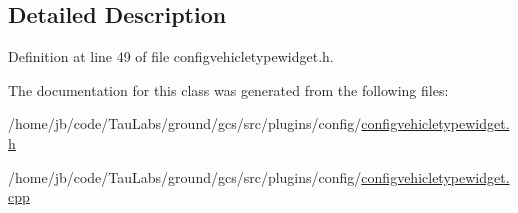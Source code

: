 \subsection{\-Detailed \-Description}


\-Definition at line 49 of file configvehicletypewidget.\-h.



\-The documentation for this class was generated from the following files\-:\begin{DoxyCompactItemize}
\item 
/home/jb/code/\-Tau\-Labs/ground/gcs/src/plugins/config/\hyperlink{configvehicletypewidget_8h}{configvehicletypewidget.\-h}\item 
/home/jb/code/\-Tau\-Labs/ground/gcs/src/plugins/config/\hyperlink{configvehicletypewidget_8cpp}{configvehicletypewidget.\-cpp}\end{DoxyCompactItemize}
